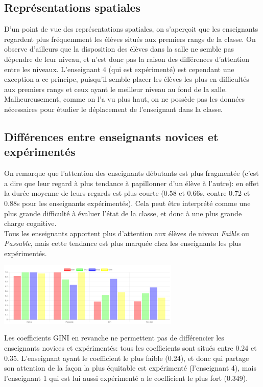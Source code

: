 \documentclass{article}
\begin{document}
\subsection{Représentations spatiales}
D'un point de vue des représentations spatiales, on s'aperçoit que les enseignants regardent plus fréquemment les élèves situés aux premiers rangs de la classe. On observe d'ailleurs que la disposition des élèves dans la salle ne semble pas dépendre de leur niveau, et n'est donc pas la raison des différences d'attention entre les niveaux. L'enseignant 4 (qui est expérimenté) est cependant une exception a ce principe, puisqu'il semble placer les élèves les plus en difficultés aux premiers rangs et ceux ayant le meilleur niveau au fond de la salle.\\
Malheureusement, comme on l'a vu plus haut, on ne possède pas les données nécessaires pour étudier le déplacement de l'enseignant dans la classe.

\subsection{Différences entre enseignants novices et expérimentés}
On remarque que l'attention des enseignants débutants est plus fragmentée (c'est a dire que leur regard à plus tendance à papillonner d'un élève à l'autre): en effet la durée moyenne de leurs regards est plus courte (0.58 et 0.66s, contre 0.72 et 0.88s pour les enseignants expérimentés). Cela peut être interprété comme une plus grande difficulté à évaluer l'état de la classe, et donc à une plus grande charge cognitive.\\
Tous les enseignants apportent plus d'attention aux élèves de niveau \textit{Faible} ou \textit{Passable}, mais cette tendance est plus marquée chez les enseignants les plus expérimentés.\\
\begin{center}
    \includegraphics[height=3cm]{niv_francais.png}
\end{center}
Les coefficients GINI en revanche ne permettent pas de différencier les enseignants novices et expérimentés: tous les coefficients sont situés entre 0.24 et 0.35. L'enseignant ayant le coefficient le plus faible (0.24), et donc qui partage son attention de la façon la plus équitable est expérimenté (l'enseignant 4), mais l'enseignant 1 qui est lui aussi expérimenté a le coefficient le plus fort (0.349).\\
\end{document}
